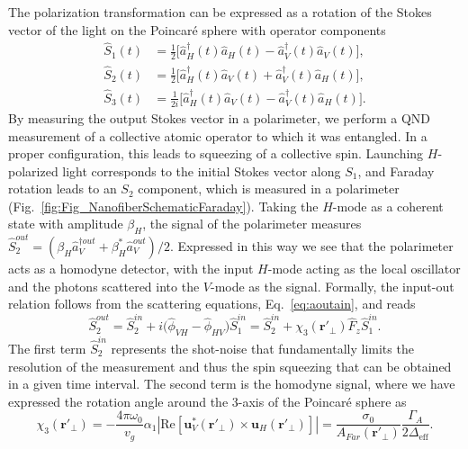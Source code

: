 \documentclass[preprint,aps,pra,onecolumn,superscriptaddress]{revtex4-1} %
\newcommand{\mbf}[1]{\mathbf{#1}}
\newcommand{\smallfrac}[2]{\mbox{$\frac{#1}{#2}$}}
\newcommand{\eff}{\text{eff}}
\newcommand{\Poincare}{Poincar\'e\xspace}
\begin{document}
The polarization transformation can be expressed as a rotation of the Stokes vector of the light on the \Poincare sphere with operator components
\begin{subequations}\label{Eq::StokesComponents}
	\begin{align}
		\hat{S}_1(t) & = \smallfrac{1}{2}\big[ \hat{a}^\dag_H(t) \hat{a}_H(t)-\hat{a}^\dag_V(t) \hat{a}_V(t) \big], \\
	 	\hat{S}_2(t) & = \smallfrac{1}{2}\big[ \hat{a}^\dag_H(t) \hat{a}_V(t)+\hat{a}^\dag_V(t) \hat{a}_H(t) \big], \\ 
		\hat{S}_3(t) & = \smallfrac{1}{2i}\big[ \hat{a}^\dag_H(t) \hat{a}_V(t) -\hat{a}^\dag_V(t) \hat{a}_H(t) \big].
	\end{align}
\end{subequations}
By measuring the output Stokes vector in a polarimeter, we perform a QND measurement of a collective atomic operator to which it was entangled.  In a proper configuration, this leads to squeezing of a collective spin.  Launching $H$-polarized light corresponds to the initial Stokes vector along $S_1$, and Faraday rotation leads to an $S_2$ component, which is measured in a polarimeter (Fig.~\ref{fig:Fig_NanofiberSchematicFaraday}).  Taking the $H$-mode as a coherent state with amplitude $\beta_H$, the signal of the polarimeter measures $\hat{S}_2^{out} = (\beta_H \hat{a}_V^{\dag out} +\beta^*_H \hat{a}_V^{out})/2$.  Expressed in this way we see that the polarimeter acts as a homodyne detector, with the input $H$-mode acting as the local oscillator and the photons scattered into the $V$-mode as the signal.  Formally, the input-out relation follows from the scattering equations, Eq.~\eqref{eq:aoutain}, and reads
\begin{equation}
\hat{S}^{out}_2 = \hat{S}^{in}_2 +i \big( \hat{\phi}_{VH}- \hat{\phi}_{HV} \big) \hat{S}^{in}_1 =  \hat{S}^{in}_2 + \chi_3(\mbf{r}'_\perp) \hat{F}_z \hat{S}^{in}_1.
\end{equation}
The first term $\hat{S}^{in}_2$ represents the shot-noise that fundamentally limits the resolution of the measurement and thus the spin squeezing that can be obtained in a given time interval.  The second term is the homodyne signal, where we have expressed the rotation angle around the 3-axis of the \Poincare sphere as
\begin{equation}
\chi_3(\mbf{r}'_\perp) = -\frac{4 \pi \omega_0}{v_g} \alpha_1 \left\vert \text{Re} \left[ \mbf{u}^*_V (\mbf{r}'_\perp) \times \mbf{u}_H (\mbf{r}'_\perp) \right] \right\vert = \frac{\sigma_0}{A_{Far}(\mbf{r}'_\perp)} \frac{\Gamma_A}{2 \Delta_{\eff}}.
\end{equation}
\end{document}
